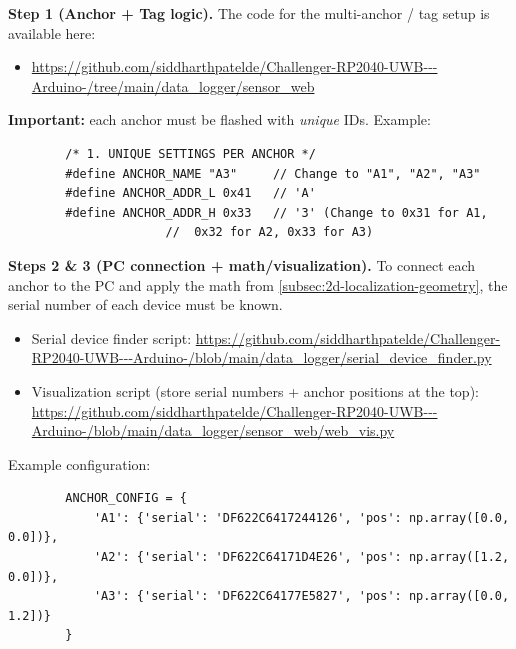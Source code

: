\documentclass[a4paper,11pt]{article}
\begin{document}
\begin{tcolorbox}[title=Note (project status: Sensor web --- Step 1),
	colback=accentlight!60!white,
	sharp corners]
	
	\textbf{Step 1 (Anchor + Tag logic).} The code for the multi-anchor / tag setup is available here:
	\begin{itemize}
		\item \url{https://github.com/siddharthpatelde/Challenger-RP2040-UWB---Arduino-/tree/main/data_logger/sensor_web}
	\end{itemize}
	
	\textbf{Important:} each anchor must be flashed with \emph{unique} IDs. Example:
	\begin{verbatim}
		/* 1. UNIQUE SETTINGS PER ANCHOR */
		#define ANCHOR_NAME "A3"     // Change to "A1", "A2", "A3"
		#define ANCHOR_ADDR_L 0x41   // 'A'
		#define ANCHOR_ADDR_H 0x33   // '3' (Change to 0x31 for A1, 
					  //  0x32 for A2, 0x33 for A3)
	\end{verbatim}
	
\end{tcolorbox}


\begin{tcolorbox}[title=Note (project status: Sensor web --- Steps 2 \& 3),
	colback=accentlight!60!white,
	sharp corners]
	
	\textbf{Steps 2 \& 3 (PC connection + math/visualization).}
	To connect each anchor to the PC and apply the math from
	\ref{subsec:2d-localization-geometry}, the serial number of each device must be known.
	
	\begin{itemize}
		\item Serial device finder script:
		\url{https://github.com/siddharthpatelde/Challenger-RP2040-UWB---Arduino-/blob/main/data_logger/serial_device_finder.py}
		\item Visualization script (store serial numbers + anchor positions at the top):
		\url{https://github.com/siddharthpatelde/Challenger-RP2040-UWB---Arduino-/blob/main/data_logger/sensor_web/web_vis.py}
	\end{itemize}
	
	Example configuration:
	\begin{verbatim}
		ANCHOR_CONFIG = {
			'A1': {'serial': 'DF622C6417244126', 'pos': np.array([0.0, 0.0])},
			'A2': {'serial': 'DF622C64171D4E26', 'pos': np.array([1.2, 0.0])},
			'A3': {'serial': 'DF622C64177E5827', 'pos': np.array([0.0, 1.2])}
		}
	\end{verbatim}
	
\end{tcolorbox}
\end{document}
